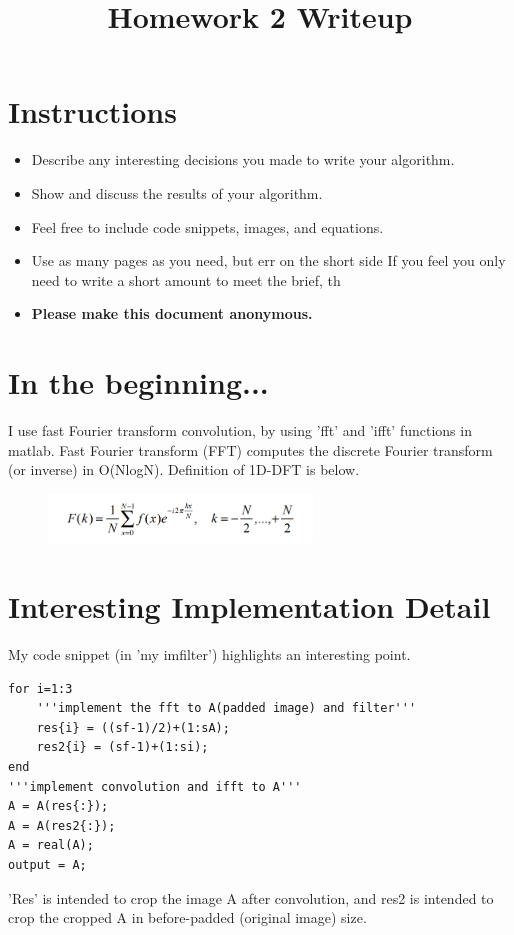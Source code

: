 \title{\vspace{-1cm}Homework 2 Writeup}



\maketitle
\vspace{-3cm}
\thispagestyle{fancy}

\section*{Instructions}
\begin{itemize}
  \item Describe any interesting decisions you made to write your algorithm.
  \item Show and discuss the results of your algorithm.
  \item Feel free to include code snippets, images, and equations.
  \item Use as many pages as you need, but err on the short side If you feel you only need to write a short amount to meet the brief, th
  
  \item \textbf{Please make this document anonymous.}
\end{itemize}

\section*{In the beginning...}

I use fast Fourier transform convolution, by using 'fft' and 'ifft' functions in matlab. Fast Fourier transform (FFT) computes the discrete Fourier transform (or inverse) in O(NlogN). Definition of 1D-DFT is below.
\begin{figure}[h]
    \centering
    \includegraphics[width=7cm]{questions/DFT.PNG}
\end{figure}

\section*{Interesting Implementation Detail}



My code snippet (in 'my imfilter') highlights an interesting point.
\begin{lstlisting}[style=Matlab-editor]
for i=1:3
    '''implement the fft to A(padded image) and filter'''
    res{i} = ((sf-1)/2)+(1:sA);
    res2{i} = (sf-1)+(1:si);
end
'''implement convolution and ifft to A'''
A = A(res{:});
A = A(res2{:});
A = real(A);
output = A;
\end{lstlisting}
'Res' is intended to crop the image A after convolution, and res2 is intended to crop the cropped A in before-padded (original image) size.


